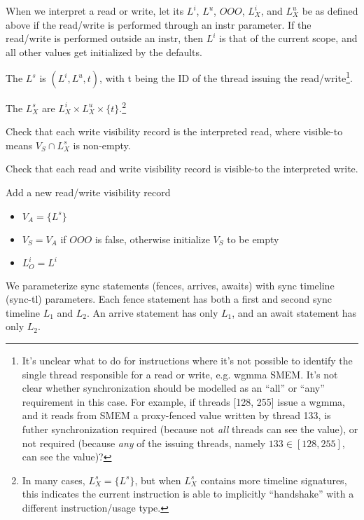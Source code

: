 \filbreak
{}

When we interpret a read or write, let its $L^i$, $L^u$, $OOO$, $L_X^i$, and $L_X^u$ be as defined above if the read/write is performed through an instr parameter.
If the read/write is performed outside an instr, then $L^i$ is that of the current scope, and all other values get initialized by the  defaults.

\filbreak
The  $L^s$ is $(L^i, L^u, t)$, with t being the ID of the thread issuing the read/write\footnote{It's unclear what to do for instructions where it's not possible to identify the single thread responsible for a read or write, e.g. wgmma SMEM.
It's not clear whether synchronization should be modelled as an ``all'' or ``any'' requirement in this case. For example, if threads [128, 255] issue a wgmma, and it reads from SMEM a proxy-fenced value written by thread 133, is futher synchronization required (because not \textit{all} threads can see the value), or not required (because \textit{any} of the issuing threads, namely $133 \in [128, 255]$, can see the value)?}.

\filbreak
The  $L_X^s$ are $L_X^i \times L_X^u \times \{ t \}$.\footnote{In many cases, $L_X^s = \{L^s\}$, but when $L_X^s$ contains more timeline signatures, this indicates the current instruction is able to implicitly ``handshake'' with a different instruction/usage type.}

 Check that each write visibility record is  the interpreted read, where visible-to means $V_S \cap L_X^s$ is non-empty.

 Check that each read and write visibility record is visible-to the interpreted write.

 Add a new read/write visibility record
\begin{itemize}
  \item $V_A = \{ L^s \}$
  \filbreak
  \item $V_S = V_A$ if $OOO$ is false, otherwise initialize $V_S$ to be empty
  \filbreak
  \item $L_O^i = L^i$
\end{itemize}

\filbreak
{}

We parameterize sync statements (fences, arrives, awaits) with sync timeline (sync-tl) parameters.
Each fence statement has both a first and second sync timeline $L_1$ and $L_2$.
An arrive statement has only $L_1$, and an await statement has only $L_2$.

